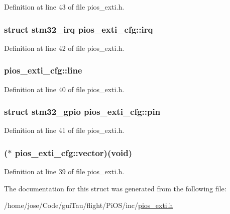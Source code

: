 Definition at line 43 of file pios\-\_\-exti.\-h.

\hypertarget{structpios__exti__cfg_a581dede4e7459e6a9586711e62c3fcc7}{
\subsubsection[{irq}]{\setlength{\rightskip}{0pt plus 5cm}struct {\bf stm32\-\_\-irq} pios\-\_\-exti\-\_\-cfg\-::irq}}\label{structpios__exti__cfg_a581dede4e7459e6a9586711e62c3fcc7}


Definition at line 42 of file pios\-\_\-exti.\-h.

\hypertarget{structpios__exti__cfg_ac8acb6d5a45610f65ed2eb066216694b}{
\subsubsection[{line}]{ pios\-\_\-exti\-\_\-cfg\-::line}}\label{structpios__exti__cfg_ac8acb6d5a45610f65ed2eb066216694b}


Definition at line 40 of file pios\-\_\-exti.\-h.

\hypertarget{structpios__exti__cfg_a099174bef966c8ee8091cb1d00343a4b}{
\subsubsection[{pin}]{\setlength{\rightskip}{0pt plus 5cm}struct {\bf stm32\-\_\-gpio} pios\-\_\-exti\-\_\-cfg\-::pin}}\label{structpios__exti__cfg_a099174bef966c8ee8091cb1d00343a4b}


Definition at line 41 of file pios\-\_\-exti.\-h.

\hypertarget{structpios__exti__cfg_a7fb58b83fd0a79e8aa956a683317723c}{
\subsubsection[{vector}]{($\ast$  pios\-\_\-exti\-\_\-cfg\-::vector)({\bf void})}}\label{structpios__exti__cfg_a7fb58b83fd0a79e8aa956a683317723c}


Definition at line 39 of file pios\-\_\-exti.\-h.



The documentation for this struct was generated from the following file\-:\begin{DoxyCompactItemize}
\item 
/home/jose/\-Code/gui\-Tau/flight/\-Pi\-O\-S/inc/\hyperlink{pios__exti_8h}{pios\-\_\-exti.\-h}\end{DoxyCompactItemize}
